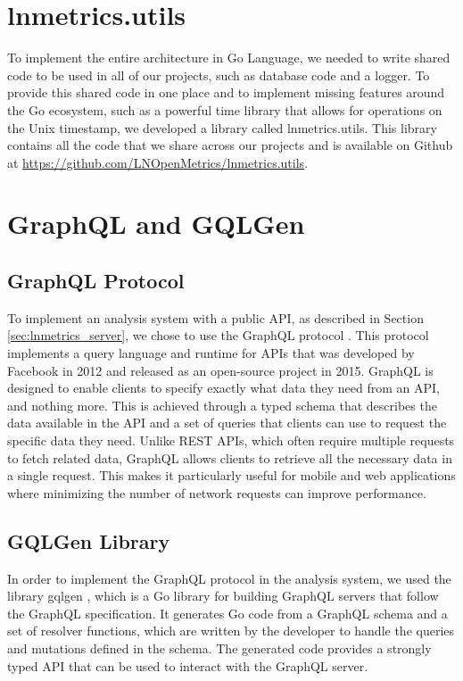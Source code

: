 \section{lnmetrics.utils}

To implement the entire architecture in Go Language, we needed to write shared 
code to be used in all of our projects, such as database code and a logger. 
To provide this shared code in one place and to implement missing features 
around the Go ecosystem, such as a powerful time library that allows for 
operations on the Unix timestamp, we developed a library called lnmetrics.utils. 
This library contains all the code that we share across our projects and is 
available on Github at \url{https://github.com/LNOpenMetrics/lnmetrics.utils}.

\section{GraphQL and GQLGen}

\subsection{GraphQL Protocol}

To implement an analysis system with a public API, as  described in 
Section \ref{sec:lnmetrics_server}, we chose to use the GraphQL protocol \cite{graphql}. 
This protocol implements a query language and runtime for APIs that was 
developed by Facebook in 2012 and released as an open-source project in 2015. 
GraphQL is designed to enable clients to specify exactly what data they need 
from an API, and nothing more. This is achieved through a typed schema that 
describes the data available in the API and a set of queries that clients can 
use to request the specific data they need. Unlike REST APIs, which often require 
multiple requests to fetch related data, GraphQL allows clients to retrieve all 
the necessary data in a single request. This makes it particularly useful for 
mobile and web applications where minimizing the number of network 
requests can improve performance.

\subsection{GQLGen Library}

In order to implement the GraphQL protocol \cite{graphql} in the analysis system, we used the library
gqlgen \cite{gqlgen}, which is a Go library for building GraphQL servers that follow the GraphQL specification. 
It generates Go code from a GraphQL schema and a set of resolver functions, which are written 
by the developer to handle the queries and mutations defined in the schema. The generated code 
provides a strongly typed API that can be used to interact with the GraphQL server.

